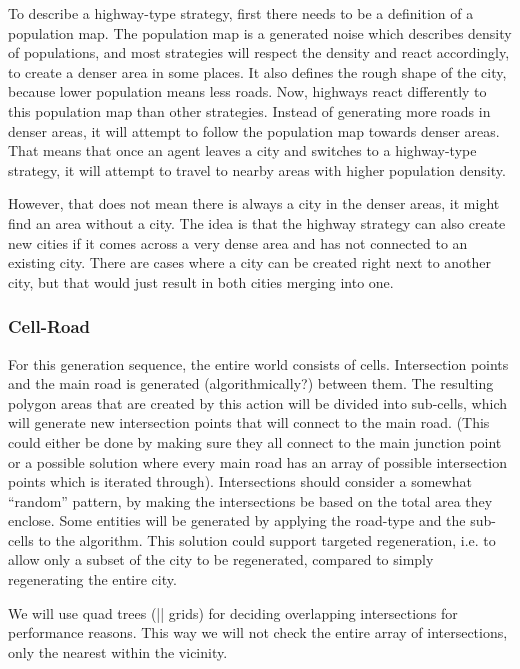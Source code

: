 To describe a highway-type strategy, first there needs to be a definition of a population map. The population map is a generated noise which describes density of populations, and most strategies
will respect the density and react accordingly, to create a denser area in some places. It also defines the rough shape of the city, because lower population means less roads.
Now, highways react differently to this population map than other strategies. Instead of generating more roads in denser areas, it will attempt to follow the population map towards denser areas.
That means that once an agent leaves a city and switches to a highway-type strategy, it will attempt to travel to nearby areas with higher population density.

However, that does not mean there is always a city in the denser areas, it might find an area without a city. The idea is that the highway strategy can also create new cities if it comes across
a very dense area and has not connected to an existing city. There are cases where a city can be created right next to another city, but that would just result in both cities merging into one.


\subsubsection{Cell-Road}
For this generation sequence, the entire world consists of cells.
Intersection points and the main road is generated (algorithmically?) between them.
The resulting polygon areas that are created by this action will be divided into sub-cells, which will generate new intersection points that will connect to the main road. (This could either be done by making sure they all connect to the main junction point or a possible solution where every main road has an array of possible intersection points which is iterated through).
Intersections should consider a somewhat “random” pattern, by making the intersections be based on the total area they enclose.
Some entities will be generated by applying the road-type and the sub-cells to the algorithm.
This solution could support targeted regeneration, i.e. to allow only a subset of the city to be regenerated, compared to simply regenerating the entire city.

We will use quad trees (|| grids) for deciding overlapping intersections for performance reasons.
This way we will not check the entire array of intersections, only the nearest within the vicinity.
